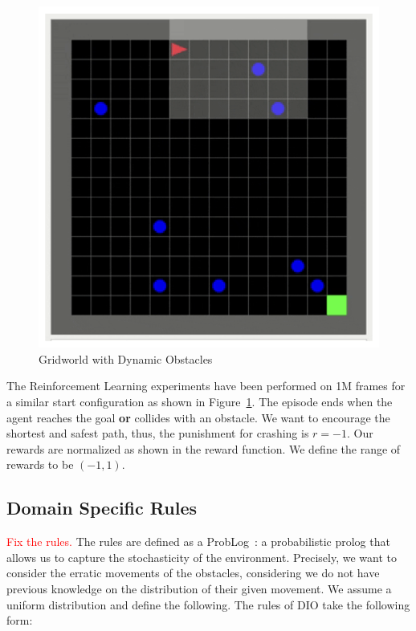 \begin{multicols}{2}[\medskip]
    \begin{figure}[H]
      \centering
      \includegraphics[scale=0.55]{figures/gridworldrl.png}
      \caption{Gridworld with Dynamic Obstacles}
      \label{fig:gridrl}
    \end{figure}
    \columnbreak
    The Reinforcement Learning experiments have been performed on 1M
    frames for a similar start configuration as shown in Figure~\ref{fig:gridrl}. The episode ends when the agent 
    reaches the goal \textbf{or} collides with an obstacle. We want to encourage the shortest and safest path, thus, the punishment for crashing is $r = -1$. Our rewards are normalized as shown in
    the reward function. We define the range of rewards to be $(-1,1)$. 
\end{multicols}

\subsection{Domain Specific Rules}
\textcolor{red}{Fix the rules.}
The rules are defined as a ProbLog~\cite{problog}: a probabilistic prolog that allows us to capture 
the stochasticity of the environment. Precisely, we want to consider the erratic movements of the obstacles, considering 
we do not have previous knowledge on the distribution of their given movement. We assume a uniform distribution and define the following. 
The rules of DIO take the following form: 

